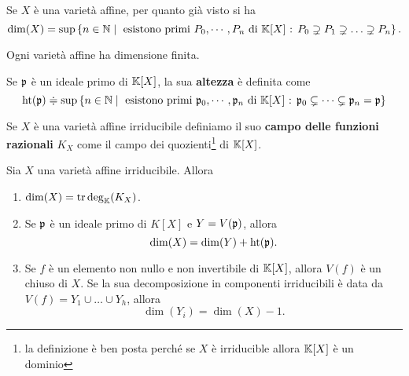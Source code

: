\begin{remark}
    Se $X$ è una varietà affine, per quanto già visto si ha 
    \[\dim(X)=\sup\left\{n\in\mathbb{N}\mid\text{ esistono primi $P_0,\cdots, P_n$ di $\mathbb{K}[X]$ : } P_0\supsetneq P_1 \supsetneq \ldots \supsetneq P_n\right\}.\] 
\end{remark}

\begin{theorem}
    Ogni varietà affine ha dimensione finita.
\end{theorem}



\begin{definition}[Altezza]
Se $\mathfrak{p}$ è un ideale primo di $\mathbb{K}[X]$, la sua \textbf{altezza} è definita come 
\[\operatorname{ht}(\mathfrak{p})\doteqdot \sup\left\{n\in\mathbb{N} \mid \text{ esistono primi $\mathfrak{p}_0,\cdots, \mathfrak{p}_n$ di $\mathbb{K}[X]$ : } \mathfrak{p}_0\subsetneq \cdots \subsetneq \mathfrak{p}_n=\mathfrak{p}\right\}\]
\end{definition}



\begin{definition}
Se $X$ \`e una variet\`a affine irriducibile definiamo il suo \textbf{campo delle funzioni razionali} $K_X$ come il campo dei quozienti\footnote{la definizione \`e ben posta perch\'e se $X$ \`e irriducible allora $\mathbb{K}[X]$ \`e un dominio} di $\mathbb{K}[X]$.
\end{definition}

\begin{theorem}
    Sia $X$ una varietà affine irriducibile. Allora \begin{enumerate}
        \item $\dim(X)=\operatorname{tr\,deg}_{\mathbb{K}}(K_X)$. 
        \item Se $\mathfrak{p}$ è un ideale primo di $K[X]$ e $Y=V(\mathfrak{p})$, allora \[\dim(X)=\dim(Y)+\operatorname{ht}(\mathfrak{p}).\]
        \item Se $f$ è un elemento non nullo e non invertibile di $\mathbb{K}[X]$, allora $V(f)$ è un chiuso di $X$. Se la sua decomposizione in componenti irriducibili è data da $V(f)=Y_1\cup\ldots\cup Y_h$, allora \[\dim(Y_i)=\dim(X)-1.\]
    \end{enumerate}
\end{theorem}
















